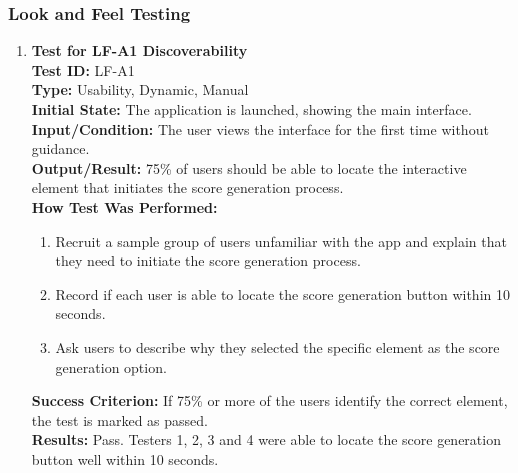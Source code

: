 \documentclass[12pt, titlepage]{article}
\begin{document}
\subsubsection{Look and Feel Testing}
\begin{enumerate}
    \item \textbf{Test for LF-A1 Discoverability} \\
      \newline
      \textbf{Test ID:} LF-A1 \\
      \textbf{Type:} Usability, Dynamic, Manual \\
      \textbf{Initial State:} The application is launched, showing the main interface. \\
      \textbf{Input/Condition:} The user views the interface for the first time without guidance. \\
      \textbf{Output/Result:} 75\% of users should be able to locate the interactive element that initiates the score generation process. \\
      \textbf{How Test Was Performed:}
      \begin{enumerate}
          \item Recruit a sample group of users unfamiliar with the app and explain that they need to initiate the score generation 
          process.
          \item Record if each user is able to locate the score generation button within 10 seconds.
          \item Ask users to describe why they selected the specific element as the score generation option.
      \end{enumerate}
      \textbf{Success Criterion:} If 75\% or more of the users identify the correct element, the test is marked as passed.\\
      \textbf{Results:} Pass. Testers 1, 2, 3 and 4 were able to locate the score generation button well within 10 seconds.\\


\end{enumerate}
\end{document}
